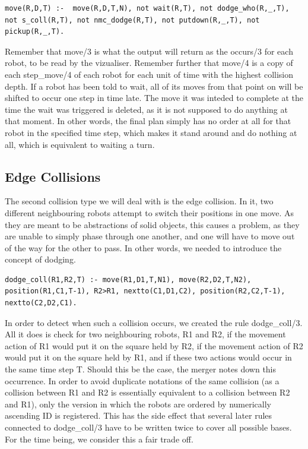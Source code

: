 \documentclass{llncs}
\begin{document}
\begin{lstlisting}[basicstyle=\fontsize{9}{11}\selectfont\ttfamily,frame=single,breaklines=true]
move(R,D,T) :-  move(R,D,T,N), not wait(R,T), not dodge_who(R,_,T), not s_coll(R,T), not nmc_dodge(R,T), not putdown(R,_,T), not pickup(R,_,T).
\end{lstlisting}
Remember that move/3 is what the output will return as the occurs/3 for each robot, to be read by the vizualiser. Remember further that move/4 is a copy of each step\_move/4 of each robot for each unit of time with the highest collision depth. If a robot has been told to wait, all of its moves from that point on will be shifted to occur one step in time late. The move it was inteded to complete at the time the wait was triggered is deleted, as it is not supposed to do anything at that moment.\newline
In other words, the final plan simply has no order at all for that robot in the specified time step, which makes it stand around and do nothing at all, which is equivalent to waiting a turn.

\subsection{Edge Collisions}
The second collision type we will deal with is the edge collision. In it, two different neighbouring robots attempt to switch their positions in one move. As they are meant to be abstractions of solid objects, this causes a problem, as they are unable to simply phase through one another, and one will have to move out of the way for the other to pass. In other words, we needed to introduce the concept of dodging. 
\begin{lstlisting}[basicstyle=\fontsize{9}{11}\selectfont\ttfamily,frame=single,breaklines=true]
dodge_coll(R1,R2,T) :- move(R1,D1,T,N1), move(R2,D2,T,N2), position(R1,C1,T-1), R2>R1, nextto(C1,D1,C2), position(R2,C2,T-1), nextto(C2,D2,C1).
\end{lstlisting}
In order to detect when such a collision occurs, we created the rule dodge\_coll/3. All it does is check for two neighbouring robots, R1 and R2, if the movement action of R1 would put it on the square held by R2, if the movement action of R2 would put it on the square held by R1, and if these two actions would occur in the same time step T. \newline Should this be the case, the merger notes down this occurrence. In order to avoid duplicate notations of the same collision (as a collision between R1 and R2 is essentially equivalent to a collision between R2 and R1), only the version in which the robots are ordered by numerically ascending ID is registered. This has the side effect that several later rules connected to dodge\_coll/3 have to be written twice to cover all possible bases. For the time being, we consider this a fair trade off.\newpage
\end{document}
